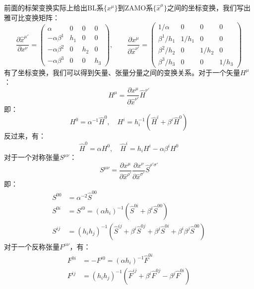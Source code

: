 \documentclass[lang=cn,color=blue,cm,11pt,scheme=chinese,bibend=bibtex,sorting=nty]{elegantbook}
\begin{document}
	前面的标架变换实际上给出BL系$\{ x^{\mu} \}$到ZAMO系$\{ \hat{x}^{\mu} \}$之间的坐标变换，我们写出雅可比变换矩阵：
	\begin{equation}
		\frac{\partial \hat{x}^{\mu'}}{\partial x^{\nu}} = \begin{pmatrix}
			\alpha & 0 & 0 & 0 \\
			- \alpha \beta^1 & h_1 & 0 & 0 \\
			- \alpha \beta^2 & 0 & h_2 & 0 \\
			- \alpha \beta^3 & 0 & 0 & h_3
		\end{pmatrix}, \qquad \frac{\partial x^{\mu}}{\partial \hat{x}^{\nu'}} = \begin{pmatrix}
			1 / \alpha & 0 & 0 & 0 \\
			\beta^1 / h_1 & 1 / h_1 & 0 & 0 \\
			\beta^2 / h_2 & 0 & 1 / h_2 & 0 \\
			\beta^3 / h_3 & 0 & 0 & 1 / h_3
		\end{pmatrix}
	\end{equation}
	有了坐标变换，我们可以得到矢量、张量分量之间的变换关系。对于一个矢量$H^{\mu}$：
	\begin{equation}
		H^{\mu} = \frac{\partial x^{\mu}}{\partial \hat{x}^{\nu'}} \hat{H}^{\nu'}
	\end{equation}
	即：
	\begin{equation}
		H^0 = \alpha^{- 1} \hat{H}^0, \quad H^i = h_i^{- 1} (\hat{H}^i + \beta^i \hat{H}^0)
	\end{equation}
	反过来，有：
	\begin{equation}
		\hat{H}^0 = \alpha H^0, \quad  \hat{H}^i = h_i H^i - \alpha \beta^i H^0
	\end{equation}
	对于一个对称张量$S^{\mu \nu}$：
	\begin{equation}
		S^{\mu \nu} = \frac{\partial x^{\mu}}{\partial \hat{x}^{\rho'}} \frac{\partial x^{\nu}}{\partial \hat{x}^{\sigma'}} \hat{S}^{\rho' \sigma'}
	\end{equation}
	即：
	\begin{align}
		S^{00} &= \alpha^{- 2} \hat{S}^{00} \\
		S^{0 i} &= S^{i 0} = (\alpha h_i)^{- 1} (\hat{S}^{0 i} + \beta^i \hat{S}^{00}) \\
		S^{i j} &= (h_i h_j)^{- 1} (\hat{S}^{i j} + \beta^i \hat{S}^{0 j} + \beta^j \hat{S}^{0 i} + \beta^i \beta^j \hat{S}^{00})
	\end{align}
	对于一个反称张量$F^{\mu \nu}$，有：
	\begin{align}
		F^{0 i} &= - F^{i 0} = (\alpha h_i)^{- 1} \hat{F}^{0 i} \\
		F^{i j} &= (h_i h_j)^{- 1} (\hat{F}^{i j} + \beta^i \hat{F}^{0 j} - \beta^j \hat{F}^{0 i})
	\end{align}
	
\end{document}
